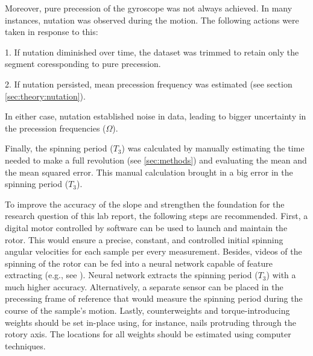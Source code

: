 Moreover, pure precession of the gyroscope was not always achieved. In many instances, nutation was observed during the motion. The following actions were taken in response to this:

1. If nutation diminished over time, the dataset was trimmed to retain only the segment coressponding to pure precession.

2. If nutation persisted, mean precession frequency was estimated (see section \ref{sec:theory:nutation}).

In either case, nutation established noise in data, leading to bigger uncertainty in the precession frequencies ($\Omega$).

Finally, the spinning period ($T_{3}$) was calculated by manually estimating the time needed to make a full revolution (see \ref{sec:methods}) and evaluating the mean and the mean squared error. This manual calculation brought in a big error in the spinning period ($T_{3}$).

To improve the accuracy of the slope and strengthen the foundation for the research question of this lab report, the following steps are recommended. First, a digital motor controlled by software can be used to launch and maintain the rotor. This would ensure a precise, constant, and controlled initial spinning angular velocities for each sample per every measurement. Besides, videos of the spinning of the rotor can be fed into a neural network capable of feature extracting (e.g., see \cite{2}). Neural network extracts the spinning period ($T_{3}$) with a much higher accuracy. Alternatively, a separate sensor can be placed in the precessing frame of reference that would measure the spinning period during the course of the sample's motion. Lastly, counterweights and torque-introducing weights should be set in-place using, for instance, nails protruding through the rotory axis. The locations for all weights should be estimated using computer techniques.   
